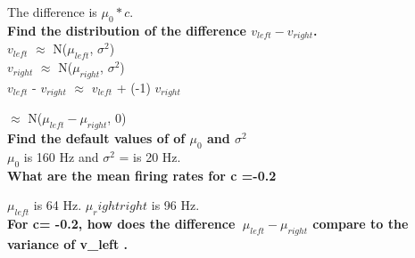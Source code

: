 The difference is $ \mu_{0}*c$.\\

\noindent \textbf{Find the distribution of the difference $ v_{left}- v_{right} $.}\\

$ v_{left}$ $\approx$ N($ \mu_{left} $, $ \sigma^{2} $)\\
\indent $ v_{right}$ $\approx$ N($ \mu_{right} $, $ \sigma^{2} $)\\

\indent $v_{left}$ - $v_{right}$ $\approx$ $v_{left}$ + (-1) $ v_{right}$ 

$ \approx $ N($\mu_{left} - \mu_{right}$, 0)\\

\noindent \textbf{Find the default values of of $ \mu_{0}$ and $ \sigma^{2}$}\\

\indent $\mu_{0}$ is 160 Hz and $ \sigma^{2}$ = is 20 Hz.\\

\noindent \textbf{What are the mean firing rates for c =-0.2}

\indent  $ \mu_{left}$ is 64 Hz. $ \mu_right{right}$ is 96 Hz.\\

\noindent \textbf{For c= -0.2, how does the difference $ \ \mu_{left} - \mu_{right} $ compare to the variance of v_{left} .} 






